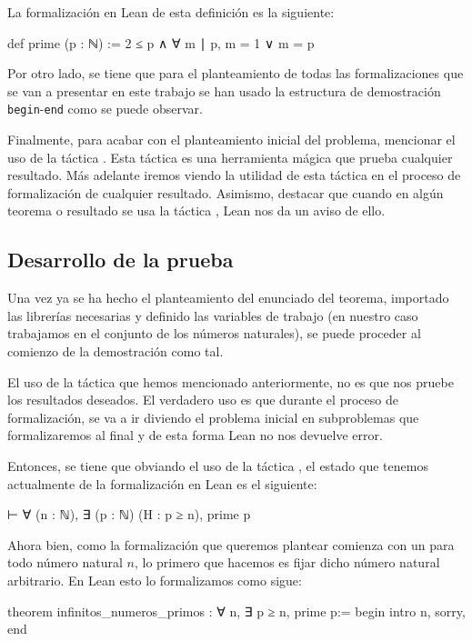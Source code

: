 La formalización en Lean de esta definición es la siguiente:
\begin{leancode}
def prime (p : ℕ) := 2 ≤ p ∧ ∀ m ∣ p, m = 1 ∨ m = p
\end{leancode}

Por otro lado, se tiene que para el planteamiento de todas las
formalizaciones que se van a presentar en este trabajo se han usado la
estructura de demostración \texttt{begin}-\texttt{end} como se puede
observar.

Finalmente, para acabar con el planteamiento inicial del problema,
mencionar el uso de la táctica . Esta táctica es
una herramienta mágica que prueba cualquier resultado. Más adelante
iremos viendo la utilidad de esta táctica en el proceso de formalización
de cualquier resultado.  Asimismo, destacar que cuando en algún teorema
o resultado se usa la táctica , Lean nos da un
aviso de ello.

\subsection{Desarrollo de la prueba}

Una vez ya se ha hecho el planteamiento del enunciado del teorema,
importado las librerías necesarias y definido las variables de trabajo
(en nuestro caso trabajamos en el conjunto de los números naturales), se
puede proceder al comienzo de la demostración como tal.

El uso de la táctica  que hemos mencionado
anteriormente, no es que nos pruebe los resultados deseados. El
verdadero uso es que durante el proceso de formalización, se va a ir
diviendo el problema inicial en subproblemas que formalizaremos al final
y de esta forma Lean no nos devuelve error.

Entonces, se tiene que obviando el uso de la táctica
, el estado que tenemos actualmente de la
formalización en Lean es el siguiente:
\begin{leancode}
⊢ ∀ (n : ℕ), ∃ (p : ℕ) (H : p ≥ n), prime p
\end{leancode}

Ahora bien, como la formalización que queremos plantear comienza con un
para todo número natural \(n\), lo primero que hacemos es fijar dicho
número natural arbitrario. En Lean esto lo formalizamos como sigue:
\begin{leancode}
theorem infinitos_numeros_primos : ∀ n, ∃ p ≥ n, prime p:=
begin
  intro n,
  sorry,
end
\end{leancode}

